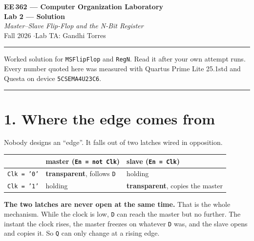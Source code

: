 \documentclass[11pt]{article}
\newcommand{\code}[1]{\texttt{#1}}
\newcommand{\hr}{\vspace{2pt}\hrule\vspace{6pt}}
\begin{document}
\begin{center}
{\Large\bfseries EE\,362 --- Computer Organization Laboratory}\\[2pt]
{\large\bfseries Lab 2 --- Solution}\\[2pt]
{\itshape Master--Slave Flip-Flop and the N-Bit Register}\\[4pt]
Fall 2026 \quad$\cdot$\quad Lab TA: Gandhi Torres
\end{center}
\hr

Worked solution for \code{MSFlipFlop} and \code{RegN}. Read it after your own
attempt runs. Every number quoted here was measured with Quartus Prime Lite
25.1std and Questa on device \code{5CSEMA4U23C6}.

\vspace{4pt}\hr

\section*{1. Where the edge comes from}

Nobody designs an ``edge''. It falls out of two latches wired in opposition.

\begin{center}
\begin{tabular}{lll}
\toprule
& master (\code{En = not Clk}) & slave (\code{En = Clk}) \\
\midrule
\code{Clk = '0'} & \textbf{transparent}, follows \code{D} & holding \\
\code{Clk = '1'} & holding & \textbf{transparent}, copies the master \\
\bottomrule
\end{tabular}
\end{center}

\textbf{The two latches are never open at the same time.} That is the whole
mechanism. While the clock is low, \code{D} can reach the master but no further.
The instant the clock rises, the master freezes on whatever \code{D} was, and the
slave opens and copies it. So \code{Q} can only change at a rising edge.

\begin{center}
\end{center}
\end{document}
